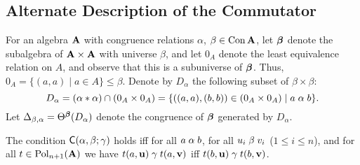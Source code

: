 \subsection{Alternate Description of the Commutator}
\label{sec:altern-descr}
For an algebra $\mathbf{A}$ with congruence relations $\alpha$, $\beta\in \operatorname{Con}\mathbf{A}$,
let $\boldsymbol{\beta}$ denote the subalgebra of $\mathbf{A}\times \mathbf{A}$ with universe 
$\beta$, and let $0_A$ denote the least equivalence relation on $A$, and observe that this is a subuniverse of $\boldsymbol{\beta}$.  Thus, $0_A = \{(a,a) \mid a\in A\} \leq \beta$.
Denote by $D_\alpha$ the following subset of $\beta \times \beta$:
\begin{equation}
  \label{eq:9009}
D_\alpha =(\alpha \mytimes \alpha) \cap (0_A \times 0_A)
= \{((a,a), (b,b)) \in (0_A \times 0_A) \mid a\alphar b\}.
\end{equation}
Let $\Delta_{\beta, \alpha} = \Theta^{\boldsymbol{\beta}}(D_\alpha)$ denote the congruence of $\boldsymbol{\beta}$ generated by
$D_\alpha$.


The condition $\mathsf{C}(\alpha, \beta; \gamma)$
holds iff for all $a \mathrel{\alpha} b$, for all $u_i \mathrel{\beta} v_i$ ($1\leq i\leq n$), and for all 
$t\in \operatorname{Pol}_{n+1}(\mathbf{A})$ we have
$t(a,\mathbf{u}) \mathrel{\gamma} t(a, \mathbf{v})$
iff $t(b,\mathbf{u}) \mathrel{\gamma} t(b, \mathbf{v})$.
\begin{comment}
Occasionally it is more convenient to write such an equivalence as a (two-way) derivation tree,
as follows:
\[
\infer=[\CC{\alpha}{\beta}{\gamma}]{\Gamma \vdash t(b,\bu) \mathrel{\gamma} t(b, \bv)}{\Gamma \vdash t(a,\bu) \mathrel{\gamma} t(a, \bv)}\]
where $\Gamma$ is a context containing
$a \alphar b$, $u_i \betar v_i$ ($1\leq i\leq n$), and 
$t\in \Pol_{n+1}(\bA)$.
\end{comment}


